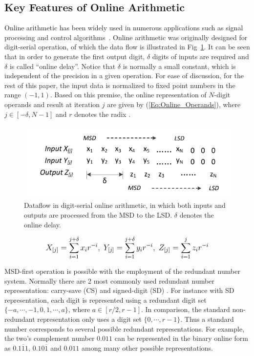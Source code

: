 \documentclass[conference]{IEEEtran}
\begin{document}
\subsection{Key Features of Online Arithmetic}

Online arithmetic has been widely used in numerous applications such as signal processing and control algorithms~\cite{Online_FPGADSP,Online_Control}. Online arithmetic was originally designed for digit-serial operation, of which the data flow is illustrated in Fig~\ref{Fig:OnlineDataFlow}. It can be seen that in order to generate the first output digit, $\delta$ digits of inputs are required and $\delta$ is called ``online delay''. Notice that $\delta$ is normally a small constant, which is independent of the precision in a given operation. For ease of discussion, for the rest of this paper, the input data is normalized to fixed point numbers in the range $(-1,1)$. Based on this premise, the online representation of $N$-digit operands and result at iteration $j$ are given by (\ref{Eq:Online_Operands}), where $j\in[-\delta,N-1]$ and $r$ denotes the radix \cite{Ercegovac_Book}.
%
\begin{figure}[tbp]
  \centering
  \includegraphics[width=.48\textwidth]{./Figures/OnlineArithmetic_DataFlow.pdf}
  \vspace{-4ex}
  \caption{Dataflow in digit-serial online arithmetic, in which both inputs and outputs are processed from the MSD to the LSD. $\delta$ denotes the online delay.}
  \vspace{-1ex}
  \label{Fig:OnlineDataFlow}
\end{figure}
%
\begin{eqnarray}\label{Eq:Online_Operands}
\footnotesize
  X_{[j]}=\sum_{i=1}^{j+\delta}x_ir^{-i},~Y_{[j]}=\sum_{i=1}^{j+\delta}y_ir^{-i},~Z_{[j]}=\sum_{i=1}^{j}z_ir^{-i}
\normalsize
\end{eqnarray}

MSD-first operation is possible with the employment of the redundant number system. Normally there are 2 most commonly used redundant number representation: carry-save (CS) \cite{CSadder} and signed-digit (SD) \cite{RedundantNumber}. For instance with SD representation, each digit is represented using a redundant digit set $\{-a, \cdots,-1,0, 1, \cdots, a\}$, where $a\in[r/2,r-1]$. In comparison, the standard non-redundant representation only uses a digit set $\{0,\cdots,r-1\}$. Thus a standard number corresponds to several possible redundant representations. For example, the two's complement number $0.011$ can be represented in the binary online form as $0.1\overline{1}1$, $0.10\overline{1}$ and $0.011$ among many other possible representations.
\end{document}
